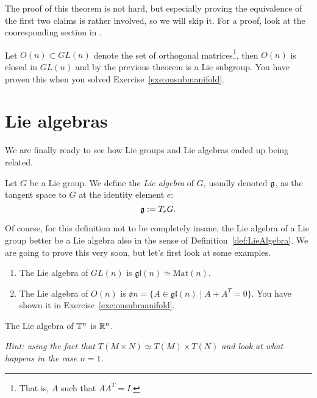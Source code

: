 The proof of this theorem is not hard, but especially proving the equivalence of the first two claims is rather involved, so we will skip it.
For a proof, look at the cooresponding section in \cite[Chapter 20]{book:lee}.

\begin{example}
  Let $O(n)\subset GL(n)$ denote the set of orthogonal matrices\footnote{That is, $A$ such that $AA^T = I$.}, then $O(n)$ is closed in $GL(n)$ and by the previous theorem is a Lie subgroup.
  You have proven this when you solved Exercise~\ref{exe:onsubmanifold}.
\end{example}

\section{Lie algebras}

We are finally ready to see how Lie groups and Lie algebras ended up being related.

\begin{definition}
  Let $G$ be a Lie group.
  We define the \emph{Lie algebra} of $G$, usually denoted $\mathfrak{g}$, as the tangent space to $G$ at the identity element $e$:
  \begin{equation}
    \mathfrak{g} := T_e G.
  \end{equation}
\end{definition}

Of course, for this definition not to be completely insane, the Lie algebra of a Lie group better be a Lie algebra also in the sense of Definition~\ref{def:LieAlgebra}.
We are going to prove this very soon, but let's first look at some examples.

\begin{example}
  \begin{enumerate}
    \item The Lie algebra of $GL(n)$ is $\mathfrak{gl}(n)\simeq \mathrm{Mat}(n)$.
    \item The Lie algebra of $O(n)$ is $\mathfrak{o}{n} = \{A \in \mathfrak{gl}(n) \mid A+A^T = 0\}$. You have shown it in Exercise~\ref{exe:onsubmanifold}.
  \end{enumerate}
\end{example}

\begin{exercise}
  The Lie algebra of $\mathbb{T}^n$ is $\mathbb{R}^n$.

  \textit{\small Hint: using the fact that $T(M\times N) \simeq T(M)\times T(N)$ and look at what happens in the case $n=1$.}
\end{exercise}

